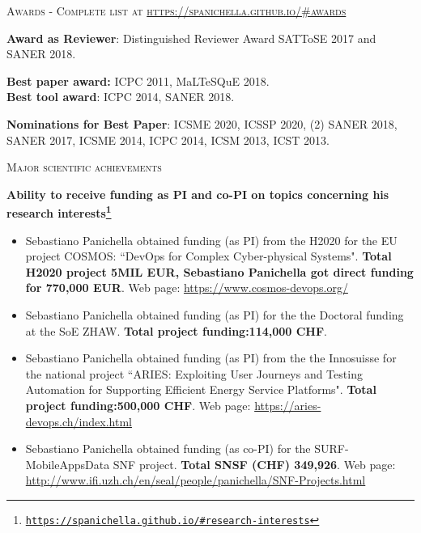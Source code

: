 \documentclass[11pt]{article}
\providecommand*\url[1]{\href{#1}{#1}}
\renewcommand*\url[1]{\href{#1}{\texttt{#1}}}
\begin{document}

\medskip\medskip\medskip

\vspace{-2.5mm}
\textsc{Awards - Complete list at \href{https://spanichella.github.io/\#awards}{https://spanichella.github.io/\#awards}}
\medskip

\textbf{Award as Reviewer}: Distinguished Reviewer Award SATToSE 2017 and SANER 2018.


\textbf{Best paper award:} ICPC 2011, MaLTeSQuE 2018.\\ 
\textbf{Best tool award}: ICPC 2014, SANER 2018. 


\textbf{Nominations for Best Paper}: ICSME 2020, ICSSP 2020, (2) SANER 2018, SANER 2017, ICSME 2014, ICPC 2014, ICSM 2013, ICST 2013.

\medskip \medskip


\textsc{\fontsize{14}{12}\selectfont Major scientific achievements}

\textbf{Ability to receive funding as PI and co-PI on topics concerning his research interests\footnote{\url{https://spanichella.github.io/\#research-interests}}}
\vspace{-2.5mm}
\begin{itemize}
  \item Sebastiano Panichella obtained funding  (as PI) from the H2020 for the EU project COSMOS: ``DevOps for Complex Cyber-physical Systems". \textbf{Total H2020 project 5MIL EUR, Sebastiano Panichella got direct funding for 770,000 EUR}. Web page: \href{https://www.cosmos-devops.org/}{https://www.cosmos-devops.org/}
  \vspace{-2mm}
   \item Sebastiano Panichella obtained funding  (as PI) for the the Doctoral funding at the SoE ZHAW. \textbf{Total project funding:\textbf{114,000 CHF}}.
    \vspace{-2mm}
  \item Sebastiano Panichella obtained funding  (as PI) from the the Innosuisse for the national project ``ARIES: Exploiting User Journeys and Testing Automation for Supporting Efficient Energy Service Platforms". \textbf{Total project funding:\textbf{500,000 CHF}}. Web page: \href{https://aries-devops.ch/index.html}{https://aries-devops.ch/index.html}
    \vspace{-2mm}
  \item Sebastiano Panichella obtained funding  (as co-PI) for
   the SURF-MobileAppsData SNF project. \textbf{Total SNSF (CHF) 349,926}. Web page: \href{http://www.ifi.uzh.ch/en/seal/people/panichella/SNF-Projects.html}{http://www.ifi.uzh.ch/en/seal/people/panichella/SNF-Projects.html}
\vspace{-2mm}
\end{itemize}
\end{document}
